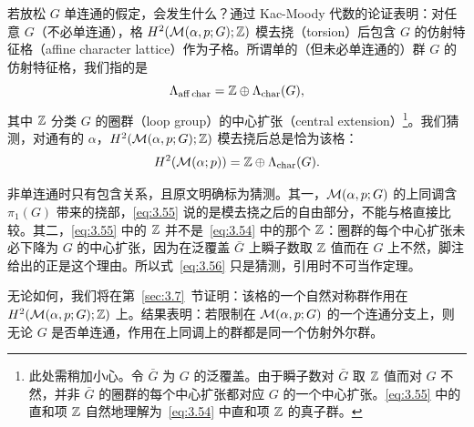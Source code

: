 若放松 $G$ 单连通的假定，会发生什么？通过 Kac-Moody 代数的论证表明：对任意 $G$（不必单连通），格 $H^2({\mathcal{M}}(\alpha,p;G); {\mathbb{Z}})$ 模去挠（torsion）后包含 $G$ 的仿射特征格（affine character lattice）作为子格。所谓单的（但未必单连通的）群 $G$ 的仿射特征格，我们指的是
\setcounter{equation}{54}
\begin{equation}\label{eq:3.55}
  \Lambda_{\rm aff\,char}={\mathbb{Z}}\oplus
\Lambda_{\rm char}(G),
\end{equation}
其中 ${\mathbb{Z}}$ 分类 $G$ 的圈群（loop group）的中心扩张（central extension）\footnote{此处需稍加小心。令 $\bar G$ 为 $G$ 的泛覆盖。由于瞬子数对 $\bar G$ 取 ${\mathbb{Z}}$ 值而对 $G$ 不然，并非 $\bar G$ 的圈群的每个中心扩张都对应 $G$ 的一个中心扩张。\eqref{eq:3.55} 中的直和项 ${\mathbb{Z}}$ 自然地理解为~\eqref{eq:3.54} 中直和项 ${\mathbb{Z}}$ 的真子群。}。我们猜测，对通有的 $\alpha$，$H^2({\mathcal{M}}(\alpha,p;G);{\mathbb{Z}})$ 模去挠后总是恰为该格：
\setcounter{equation}{55}
\begin{equation}\label{eq:3.56}
  H^2({\mathcal{M}}(\alpha;p))={\mathbb{Z}}\oplus \Lambda_{\rm char}(G).
\end{equation}

\begin{yizhu}[易错点]非单连通时只有包含关系，且原文明确标为猜测。其一，${\mathcal{M}}(\alpha,p;G)$ 的上同调含 $\pi_1(G)$ 带来的挠部，\eqref{eq:3.55} 说的是模去挠之后的自由部分，不能与格直接比较。其二，\eqref{eq:3.55} 中的 ${\mathbb{Z}}$ 并不是~\eqref{eq:3.54} 中的那个 ${\mathbb{Z}}$：圈群的每个中心扩张未必下降为 $G$ 的中心扩张，因为在泛覆盖 $\bar G$ 上瞬子数取 ${\mathbb{Z}}$ 值而在 $G$ 上不然，脚注给出的正是这个理由。所以式~\eqref{eq:3.56} 只是猜测，引用时不可当作定理。\end{yizhu}

无论如何，我们将在第~\ref{sec:3.7}~节证明：该格的一个自然对称群作用在 $H^2({\mathcal{M}}(\alpha,p;G);{\mathbb{Z}})$ 上。结果表明：若限制在 ${\mathcal{M}}(\alpha,p;G)$ 的一个连通分支上，则无论 $G$ 是否单连通，作用在上同调上的群都是同一个仿射外尔群。

\bigskip{}

